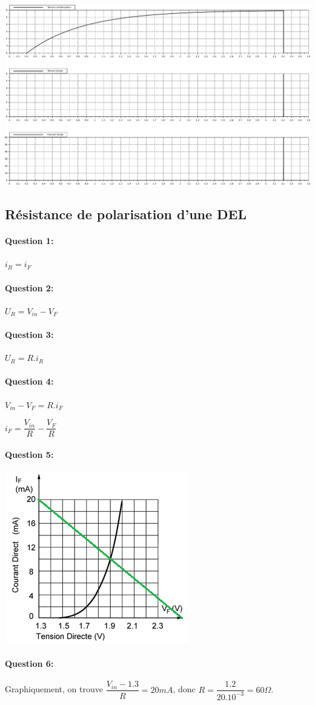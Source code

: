 \begin{center}
 \includegraphics[width=0.8\linewidth]{img/Flash_results}
\end{center}

\subsection{Résistance de polarisation d'une DEL}

\paragraph{Question 1:} $i_R=i_F$

\paragraph{Question 2:} $U_R=V_{in}-V_F$

\paragraph{Question 3:} $U_R=R.i_R$

\paragraph{Question 4:} $V_{in}-V_F=R.i_F$

$i_F=\dfrac{V_{in}}{R}-\dfrac{V_F}{R}$

\paragraph{Question 5:} 

\begin{center}
\includegraphics[width=0.5\linewidth]{img/DEL_carac_cor}
\end{center}

\paragraph{Question 6:} Graphiquement, on trouve $\dfrac{V_{in}-1.3}{R}=20mA$, donc $R=\dfrac{1.2}{20.10^{-3}}=60\Omega$.


